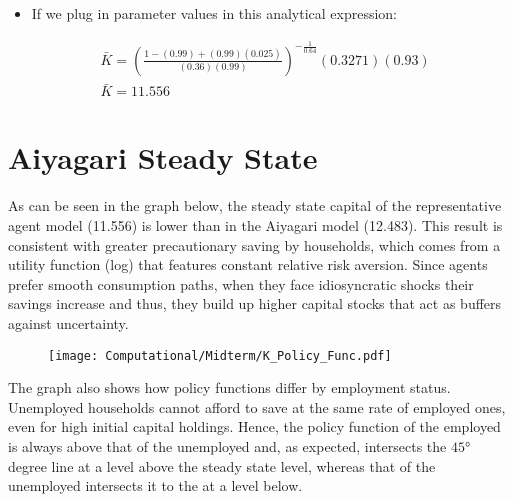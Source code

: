 \documentclass[12pt]{article}
\begin{document}
\begin{itemize}
  \item If we plug in parameter values in this analytical expression:
\end{itemize}

$$
\begin{aligned}
& \bar{K}=\left(\frac{1-(0.99)+(0.99)(0.025)}{(0.36)(0.99)}\right)^{-\frac{1}{0.64}}(0.3271)(0.93) \\
& \bar{K}= 11.556
\end{aligned}
$$

\section{Aiyagari Steady State}
As can be seen in the graph below, the steady state capital of the representative agent model (11.556) is lower than in the Aiyagari model (12.483). This result is consistent with greater precautionary saving by households, which comes from a utility function (log) that features constant relative risk aversion. Since agents prefer smooth consumption paths, when they face idiosyncratic shocks their savings increase and thus, they build up higher capital stocks that act as buffers against uncertainty. \\
\begin{figure}[h!]
    \centering
    \vspace{1cm}
    \texttt{[image: Computational/Midterm/K\_Policy\_Func.pdf]}
\end{figure}

The graph also shows how policy functions differ by employment status. Unemployed households cannot afford to save at the same rate of employed ones, even for high initial capital holdings. Hence, the policy function of the employed is always above that of the unemployed and, as expected, intersects the $45°$ degree line at a level above the steady state level, whereas that of the unemployed intersects it to the at a level below.
\newpage
\end{document}
